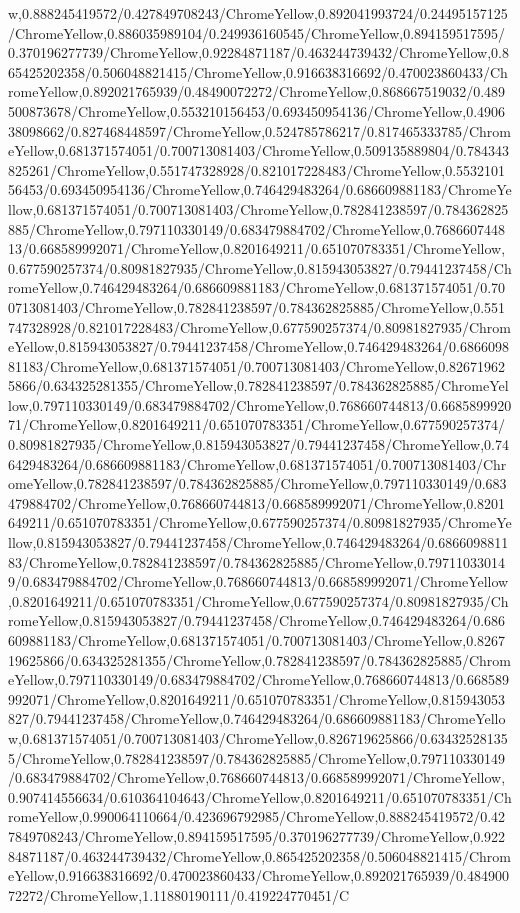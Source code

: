 {\begin{tikzternal}
{w,0.888245419572/0.427849708243/ChromeYellow,0.892041993724/0.24495157125/ChromeYellow,0.886035989104/0.249936160545/ChromeYellow,0.894159517595/0.370196277739/ChromeYellow,0.92284871187/0.463244739432/ChromeYellow,0.865425202358/0.506048821415/ChromeYellow,0.916638316692/0.470023860433/ChromeYellow,0.892021765939/0.48490072272/ChromeYellow,0.868667519032/0.489500873678/ChromeYellow,0.553210156453/0.693450954136/ChromeYellow,0.490638098662/0.827468448597/ChromeYellow,0.524785786217/0.817465333785/ChromeYellow,0.681371574051/0.700713081403/ChromeYellow,0.509135889804/0.784343825261/ChromeYellow,0.551747328928/0.821017228483/ChromeYellow,0.553210156453/0.693450954136/ChromeYellow,0.746429483264/0.686609881183/ChromeYellow,0.681371574051/0.700713081403/ChromeYellow,0.782841238597/0.784362825885/ChromeYellow,0.797110330149/0.683479884702/ChromeYellow,0.768660744813/0.668589992071/ChromeYellow,0.8201649211/0.651070783351/ChromeYellow,0.677590257374/0.80981827935/ChromeYellow,0.815943053827/0.79441237458/ChromeYellow,0.746429483264/0.686609881183/ChromeYellow,0.681371574051/0.700713081403/ChromeYellow,0.782841238597/0.784362825885/ChromeYellow,0.551747328928/0.821017228483/ChromeYellow,0.677590257374/0.80981827935/ChromeYellow,0.815943053827/0.79441237458/ChromeYellow,0.746429483264/0.686609881183/ChromeYellow,0.681371574051/0.700713081403/ChromeYellow,0.826719625866/0.634325281355/ChromeYellow,0.782841238597/0.784362825885/ChromeYellow,0.797110330149/0.683479884702/ChromeYellow,0.768660744813/0.668589992071/ChromeYellow,0.8201649211/0.651070783351/ChromeYellow,0.677590257374/0.80981827935/ChromeYellow,0.815943053827/0.79441237458/ChromeYellow,0.746429483264/0.686609881183/ChromeYellow,0.681371574051/0.700713081403/ChromeYellow,0.782841238597/0.784362825885/ChromeYellow,0.797110330149/0.683479884702/ChromeYellow,0.768660744813/0.668589992071/ChromeYellow,0.8201649211/0.651070783351/ChromeYellow,0.677590257374/0.80981827935/ChromeYellow,0.815943053827/0.79441237458/ChromeYellow,0.746429483264/0.686609881183/ChromeYellow,0.782841238597/0.784362825885/ChromeYellow,0.797110330149/0.683479884702/ChromeYellow,0.768660744813/0.668589992071/ChromeYellow,0.8201649211/0.651070783351/ChromeYellow,0.677590257374/0.80981827935/ChromeYellow,0.815943053827/0.79441237458/ChromeYellow,0.746429483264/0.686609881183/ChromeYellow,0.681371574051/0.700713081403/ChromeYellow,0.826719625866/0.634325281355/ChromeYellow,0.782841238597/0.784362825885/ChromeYellow,0.797110330149/0.683479884702/ChromeYellow,0.768660744813/0.668589992071/ChromeYellow,0.8201649211/0.651070783351/ChromeYellow,0.815943053827/0.79441237458/ChromeYellow,0.746429483264/0.686609881183/ChromeYellow,0.681371574051/0.700713081403/ChromeYellow,0.826719625866/0.634325281355/ChromeYellow,0.782841238597/0.784362825885/ChromeYellow,0.797110330149/0.683479884702/ChromeYellow,0.768660744813/0.668589992071/ChromeYellow,0.907414556634/0.610364104643/ChromeYellow,0.8201649211/0.651070783351/ChromeYellow,0.990064110664/0.423696792985/ChromeYellow,0.888245419572/0.427849708243/ChromeYellow,0.894159517595/0.370196277739/ChromeYellow,0.92284871187/0.463244739432/ChromeYellow,0.865425202358/0.506048821415/ChromeYellow,0.916638316692/0.470023860433/ChromeYellow,0.892021765939/0.48490072272/ChromeYellow,1.11880190111/0.419224770451/C}
\end{tikzternal}}
